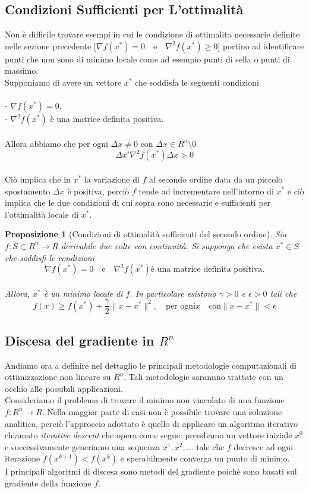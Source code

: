 \documentclass[a4paper, 12pt]{article}
\newtheorem{prop}{Proposizione}
\begin{document}
\subsection{Condizioni Sufficienti per L'ottimalità}
Non è difficile trovare esempi in cui le condizione di ottimalita necessarie definite nelle sezione precedente
[$\nabla f(x^\ast) = 0 \quad \mbox{e} \quad \nabla^2 f(x^\ast) \geq 0$]
portino ad identificare punti che non sono di minimo locale come ad esempio punti di sella o punti di massimo.\\
Supponiamo di avere un vettore $x^\ast$ che soddisfa le seguenti condizioni\\\\
- $\nabla f(x^\ast) = 0$.\\
- $\nabla^2 f(x^\ast)$ è una matrice definita positiva.\\\\
Allora abbiamo che per ogni $\Delta x \neq 0$ con $\Delta x \in R^n \setminus 0$\\
\[\Delta x' \nabla^2f(x^\ast) \Delta x > 0\]\\
Ciò implica che in $x^\ast$ la variazione di $f$ al secondo ordine data da un piccolo spostamento $\Delta x$ è positiva, perciò $f$ tende ad incrementare nell'intorno di $x^\ast$ e ciò implica che le due condizioni di cui sopra sono necessarie e sufficienti per l'ottimalità locale di $x^\ast$.
\begin{prop}[Condizioni di ottimalità sufficienti del secondo ordine] Sia $f:S \subset R^n \to R$ derivabile due volte con continuità. Si supponga che esista $x^\ast \in S$ che soddisfi le condizioni\\
\[\nabla f(x^\ast) = 0 \quad \mbox{e} \quad \nabla^2 f(x^\ast) \mbox{è una matrice definita positiva.}\]\\
Allora, $x^\ast$ è un minimo locale di $f$. In particolare esistono $\gamma > 0$ e $\epsilon > 0$ tali che\\
\[ f(x) \geq f(x^\ast) + \frac{\gamma}{2} \parallel x - x^\ast \parallel^2, \quad \mbox{per ogni} x \quad \mbox{con} \parallel x - x^\ast \parallel < \epsilon  \]
\end{prop}
\subsection{Discesa del gradiente in $R^n$}
Andiamo ora a definire nel dettaglio le principali metodologie computazionali di ottimizzazione non lineare su $R^n$. Tali metodologie sarannno trattate con un occhio alle possibili applicazioni.\\
Consideriamo il problema di trovare il minimo non vincolato di una funzione $f:R^n \to R$. Nella maggior parte di casi non è possibile trovare una soluzione analitica, perciò l'approccio adottato è quello di applicare un algoritmo iterativo chiamato \textit{iterative descent} che opera come segue: prendiamo un vettore iniziale $x^0$ e successivamente generiamo una sequenza $x^1, x^2, ...$ tale che $f$ decresce ad ogni iterazione $f(x^{k+1}) < f(x^k)$ e sperabilmente converga un punto di minimo.\\
I principali algoritmi di discesa sono metodi del gradiente poichè sono basati sul gradiente della funzione $f$.
\end{document}
